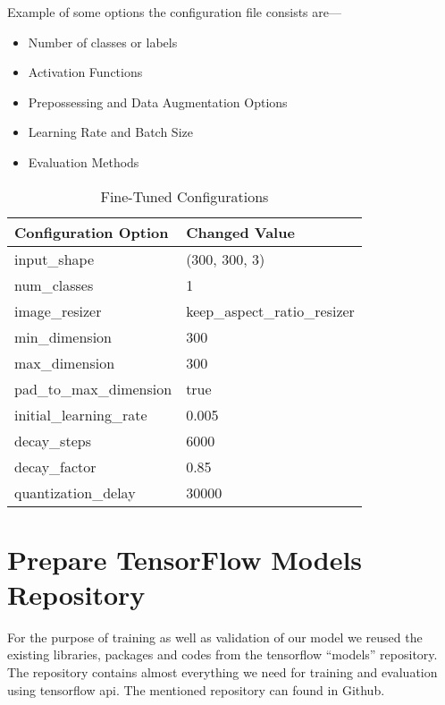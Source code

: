             Example of some options the configuration file consists are---
            \begin{itemize}
                \item {Number of classes or labels}
                \item {Activation Functions}
                \item {Prepossessing and Data Augmentation Options}
                \item {Learning Rate and Batch Size}
                \item {Evaluation Methods}
            \end{itemize}
            \begin{table}
                \centering
                \begin{tabular}{|l|l|} \hline 
                     Configuration Option  &  Changed Value \\\hline\hline
                     input\_shape  &  (300, 300, 3) \\\hline
                     num\_classes  &  1 \\\hline
                     image\_resizer  &  keep\_aspect\_ratio\_resizer \\\hline
                     min\_dimension  &  300 \\\hline
                     max\_dimension  &  300 \\\hline
                     pad\_to\_max\_dimension  &  true \\\hline
                     initial\_learning\_rate  &  0.005 \\\hline
                     decay\_steps  &  6000 \\\hline
                     decay\_factor  &  0.85 \\\hline
                     quantization\_delay  &  30000 \\\hline
                \end{tabular}
                \caption{Fine-Tuned Configurations}
                \label{tab:fine_tuned_conf}
            \end{table}
    \section{Prepare TensorFlow Models Repository}
        For the purpose of training as well as validation of our model we reused the existing libraries, packages and codes from the \gls{tensorflow} ``models'' repository. The repository contains almost everything we need for training and evaluation using \gls{tensorflow} \acrshort{api}. The mentioned repository can found in Github\cite{tf_models_repo}.
        
